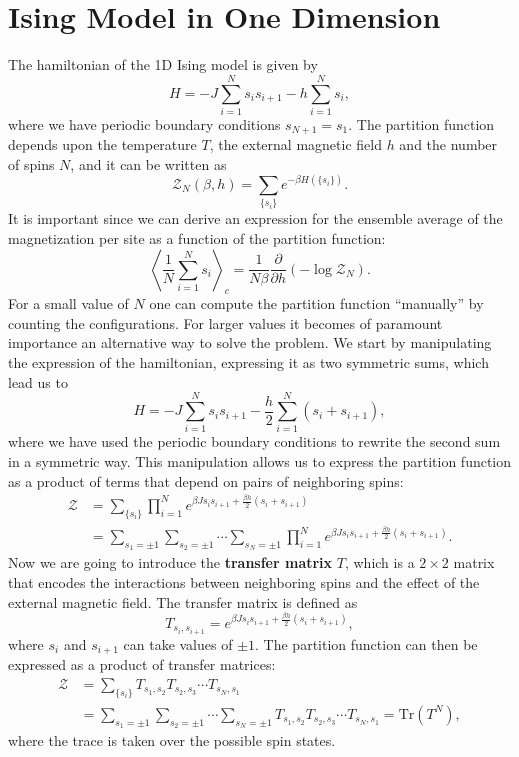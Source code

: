\section{Ising Model in One Dimension}

The hamiltonian of the 1D Ising model is given by
\[
    H = -J \sum_{i=1}^{N} s_i s_{i+1} - h \sum_{i=1}^{N} s_i,
\]
where we have periodic boundary conditions \(s_{N+1} = s_1\). The partition function depends upon the temperature \(T\), the external magnetic field \(h\) and the number of spins \(N\), and it can be written as
\[
    \mathcal{Z}_N(\beta, h) = \sum_{\{s_i\}} e^{-\beta H(\{s_i\})}.
\]
It is important since we can derive an expression for the ensemble average of the magnetization per site as a function of the partition function:
\[
    \left\langle \frac{1}{N} \sum_{i=1}^{N} s_i \right\rangle_c = \frac{1}{N\beta} \frac{\partial}{\partial h} (-\log \mathcal{Z}_N).
\]
For a small value of \(N\) one can compute the partition function ``manually'' by counting the configurations. For larger values it becomes of paramount importance an alternative way to solve the problem. We start by manipulating the expression of the hamiltonian, expressing it as two symmetric sums, which lead us to
\[
    H = -J \sum_{i=1}^{N} s_i s_{i+1} - \frac{h}{2} \sum_{i=1}^{N} (s_i + s_{i+1}),
\]
where we have used the periodic boundary conditions to rewrite the second sum in a symmetric way. This manipulation allows us to express the partition function as a product of terms that depend on pairs of neighboring spins:
\[
    \begin{aligned}
        \mathcal{Z} & = \sum_{\{s_i\}} \prod_{i=1}^{N} e^{\beta J s_i s_{i+1} + \frac{\beta h}{2} (s_i + s_{i+1})}                                                   \\
                    & = \sum_{s_1 = \pm 1} \sum_{s_2 = \pm 1} \cdots \sum_{s_N = \pm 1} \prod_{i=1}^{N} e^{\beta J s_i s_{i+1} + \frac{\beta h}{2} (s_i + s_{i+1})}.
    \end{aligned}
\]
Now we are going to introduce the \textbf{transfer matrix} \(T\), which is a \(2 \times 2\) matrix that encodes the interactions between neighboring spins and the effect of the external magnetic field. The transfer matrix is defined as
\[
    T_{s_i, s_{i+1}} = e^{\beta J s_i s_{i+1} + \frac{\beta h}{2} (s_i + s_{i+1})},
\]
where \(s_i\) and \(s_{i+1}\) can take values of \(\pm 1\). The partition function can then be expressed as a product of transfer matrices:
\[
    \begin{aligned}
        \mathcal{Z} & = \sum_{\{s_i\}} T_{s_1, s_2} T_{s_2, s_3} \cdots T_{s_N, s_1}                                                                    \\
                    & = \sum_{s_1 = \pm 1} \sum_{s_2 = \pm 1} \cdots \sum_{s_N = \pm 1} T_{s_1, s_2} T_{s_2, s_3} \cdots T_{s_N, s_1} = \text{Tr}(T^N),
    \end{aligned}
\]
where the trace is taken over the possible spin states.

